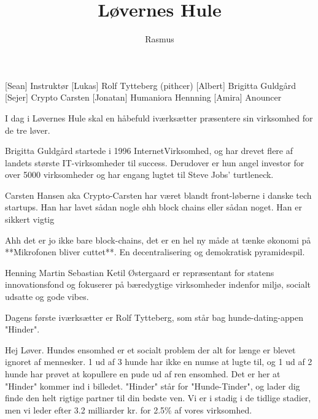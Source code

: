 \documentclass[a4paper,11pt]{article}
\title{Løvernes Hule}
\author{Rasmus}
\begin{document}
\maketitle


\begin{roles}
[Sean] Instruktør
[Lukas] Rolf Tytteberg (pithcer)
[Albert] Brigitta Guldgård
[Sejer] Crypto Carsten
[Jonatan] Humaniora Hennning
 [Amira] Anouncer
\end{roles}
\begin{props}
\end{props}



\begin{sketch}
 I dag i Løvernes Hule skal en håbefuld iværksætter præsentere sin virksomhed for de tre løver.


 Brigitta Guldgård startede i 1996 InternetVirksomhed, og har drevet flere af landets største IT-virksomheder til success. Derudover er hun angel investor for over 5000 virksomheder og har engang lugtet til Steve Jobs' turtleneck.


 Carsten Hansen aka Crypto-Carsten har været blandt front-løberne i danske tech startups. Han har lavet sådan nogle øhh block chains eller sådan noget. Han er sikkert vigtig


 Ahh det er jo ikke bare block-chains, det er en hel ny måde at tænke økonomi på **Mikrofonen bliver cuttet**. En decentralisering og demokratisk pyramidespil.


 Henning Martin Sebastian Ketil Østergaard er repræsentant for statens innovationsfond og fokuserer på bæredygtige virksomheder indenfor miljø, socialt udsatte og gode vibes.


 Dagens første iværksætter er Rolf Tytteberg, som står bag hunde-dating-appen "Hinder".


 Hej Løver.
Hundes ensomhed er et socialt problem der alt for længe er blevet ignoret af mennesker. 1 ud af 3 hunde har ikke en numse at lugte til, og 1 ud af 2 hunde har prøvet at kopullere en pude ud af ren ensomhed.
Det er her at "Hinder" kommer ind i billedet. "Hinder" står for "Hunde-Tinder", og lader dig finde den helt rigtige partner til din bedste ven.
Vi er i stadig i de tidlige stadier, men vi leder efter 3.2 milliarder kr. for 2.5\% af vores virksomhed.


\end{sketch}
\end{document}
